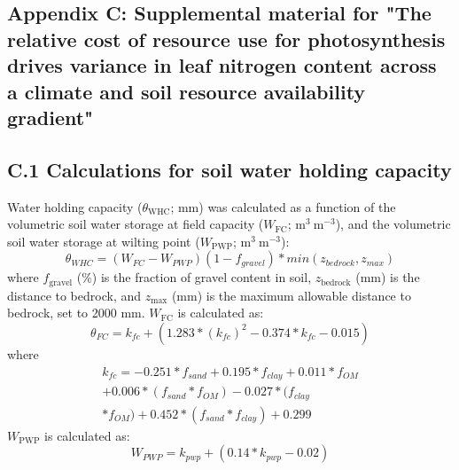 \begin{singlespace}
    \chapter{\textbf{Appendix C: Supplemental material for "The relative cost of resource use for photosynthesis drives variance in leaf nitrogen content across a climate and soil resource availability gradient"}}
\end{singlespace}

\setcounter{table}{0}
\renewcommand{\thetable}{C\arabic{table}}

\setcounter{figure}{0}
\renewcommand{\thefigure}{C\arabic{figure}}


\section*{C.1 Calculations for soil water holding capacity}\label{appendix.c1}
\noindent Water holding capacity ($\theta_\mathrm{WHC}$; mm) was calculated as a function of the volumetric soil water storage at field capacity ($W_\mathrm{FC}$; $\mathrm{m^3\ m^{-3}}$), and the volumetric soil water storage at wilting point ($W_\mathrm{PWP}$; $\mathrm{m^3\ m^{-3}}$):
\begin{equation}
    \label{eqn_s4.1} \tag{C$_4$.1}
    \theta_{WHC} = (W_{FC}-W_{PWP})(1-f_{gravel}) * min(z_{bedrock}, z_{max})
\end{equation}
\noindent where $f_\mathrm{gravel}$ (\%) is the fraction of gravel content in soil, $z_\mathrm{bedrock}$ (mm) is the distance to bedrock, and $z_\mathrm{max}$ (mm) is the maximum allowable distance to bedrock, set to 2000 mm. $W_\mathrm{FC}$ is calculated as:
\begin{equation}
    \label{eqn_s4.2} \tag{C$_4$.2}
    \theta_{FC} = k_{fc}+(1.283*(k_{fc})^2-0.374*k_{fc}-0.015)
\end{equation}
\noindent where
\begin{equation}
    \label{eqn_s4.3} \tag{C$_4$.3}
    \begin{aligned}
        k_{fc}= -0.251 * f_{sand} + 0.195 * f_{clay} + 0.011 * f_{OM} \\ + 0.006 * (f_{sand} * f_{OM}) - 0.027 * (f_{clay} \\ * f_{OM}) + 0.452 * (f_{sand} * f_{clay}) + 0.299
    \end{aligned}	
\end{equation}
\noindent $W_\mathrm{PWP}$ is calculated as:
\begin{equation}
    \label{eqn_s4.4} \tag{C$_4$.4}
    W_{PWP}=k_{pwp}+(0.14*k_{pwp}-0.02)	
\end{equation}
